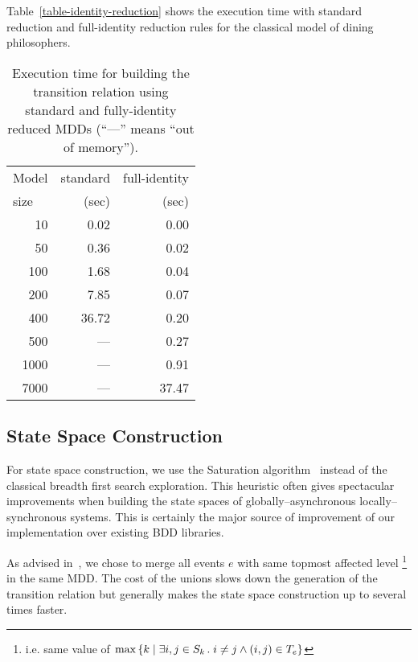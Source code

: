 \documentclass[a4paper,oneside,11pt,pdftex]{llncs}
\begin{document}
Table~\vref{table-identity-reduction} shows the execution time
with standard reduction and full-identity reduction rules for the classical model
of dining philosophers.
\begin{table}[htbp]
  \centering
  \begin{tabular}{|r||r|r|}
    \hline
    \multicolumn{1}{|l||}{Model} & standard & full-identity \\
    \multicolumn{1}{|l||}{size}  & (sec) & (sec) \\
    \hline
      10& 0.02& 0.00\\
      50& 0.36& 0.02\\
     100& 1.68& 0.04\\
     200& 7.85& 0.07\\
     400&36.72& 0.20\\
     500&  ---& 0.27\\
    1000&  ---& 0.91\\
    7000&  ---&37.47\\
    \hline
  \end{tabular}
\vspace*{3mm}
  \caption{Execution time for building the transition relation
using standard and fully-identity reduced MDDs (``---'' means ``out of memory'').}
  \label{table-identity-reduction}
\end{table}

\subsection{State Space Construction}

For state space construction, we use the Saturation algorithm~\cite{Saturation2001}
instead of the classical breadth first search exploration. This heuristic
often gives spectacular improvements when building the state spaces
of globally--asynchronous locally--synchronous systems.
This is certainly the major source of improvement of our implementation
over existing BDD libraries.

As advised in~\cite{Ciardo2005}, we chose to merge all events $e$
with same topmost affected level%
\footnote{i.e. same value of ${\rm max}\left\{k\;|\;\exists i, j \in S_k\,.\; i \neq j \land (i, j) \in T_e \right\}$}
in the same MDD. The cost of the unions slows down the generation of the transition relation
but generally makes the state space construction up to several times faster.
\end{document}

